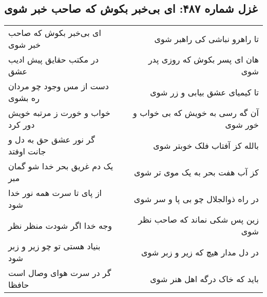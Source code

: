 \begin{center}
\section*{غزل شماره ۴۸۷: ای بی‌خبر بکوش که صاحب خبر شوی}
\label{sec:sh487}
\begin{longtable}{l p{0.5cm} r}
ای بی‌خبر بکوش که صاحب خبر شوی
&&
تا راهرو نباشی کی راهبر شوی
\\
در مکتب حقایق پیش ادیب عشق
&&
هان ای پسر بکوش که روزی پدر شوی
\\
دست از مس وجود چو مردان ره بشوی
&&
تا کیمیای عشق بیابی و زر شوی
\\
خواب و خورت ز مرتبه خویش دور کرد
&&
آن گه رسی به خویش که بی خواب و خور شوی
\\
گر نور عشق حق به دل و جانت اوفتد
&&
بالله کز آفتاب فلک خوبتر شوی
\\
یک دم غریق بحر خدا شو گمان مبر
&&
کز آب هفت بحر به یک موی تر شوی
\\
از پای تا سرت همه نور خدا شود
&&
در راه ذوالجلال چو بی پا و سر شوی
\\
وجه خدا اگر شودت منظر نظر
&&
زین پس شکی نماند که صاحب نظر شوی
\\
بنیاد هستی تو چو زیر و زبر شود
&&
در دل مدار هیچ که زیر و زبر شوی
\\
گر در سرت هوای وصال است حافظا
&&
باید که خاک درگه اهل هنر شوی
\\
\end{longtable}
\end{center}
